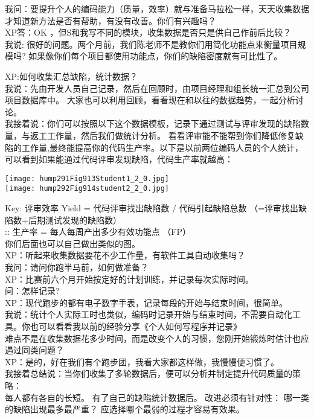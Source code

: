 我问：要提升个人的编码能力（质量，效率）就与准备马拉松一样，天天收集数据才知道新方法是否有帮助，有没有改善。你们有兴趣吗？\\
XP答：OK ，但S和我写不同的模块，收集数据是否只是供自己作前后比较？\\
我说:
很好的问题。两个月前，我们陈老师不是教你们用简化功能点来衡量项目规模吗?
如果像你们每个项目都使用功能点，你们的缺陷密度就有可比性了。

XP:如何收集汇总缺陷，统计数据？\\
我说：先由开发人员自己记录，然后在回顾时，由项目经理和组长统一汇总到公司项目数据库中。
大家也可以利用回顾，看看现在和以往的数据趋势，一起分析讨论。\\
我接着说：你们可以按照以下这个数据模板，记录下通过测试与评审发现的缺陷数量，与返工工作量，然后我们做统计分析。
看看评审能不能帮到你们降低修复缺陷的工作量,最终能提高你的代码生产率。以下是以前两位编码人员的个人统计，可以看到如果能通过代码评审发现缺陷，代码生产率就越高：

\texttt{[image: hump291Fig913Student1\_2\_0.jpg]}\\
\texttt{[image: hump292Fig914student2\_2\_0.jpg]}

Key: 评审效率 Yield = 代码评审找出缺陷数 / 代码引起缺陷总数
（=评审找出缺陷数+后期测试发现的缺陷数）\\
:: 生产率 = 每人每周产出多少有效功能点 （FP）\\
你们后面也可以自己做出类似的图。\\
XP：听起来收集数据要花不少工作量，有软件工具自动收集吗？\\
我问：请问你跑半马前，如何做准备？\\
XP：比赛前六个月开始按定好的计划训练，并记录每次实际时间。\\
问：怎样记录?\\
XP：现代跑步的都有电子数字手表，记录每段的开始与结束时间，很简单。\\
我说：统计个人实际工时也类似，编码时记录开始与结束时间，不需要自动化工具。你也可以看看我以前的经验分享《个人如何写程序并记录》\\
难点不是在收集数据花多少时间，而是改变个人的习惯，您刚开始锻炼时估计也应遇过同类问题？\\
XP：是的，好在我们有个跑步团，我看大家都这样做，我慢慢便习惯了。\\
我接着总结说：当你们收集了多轮数据后，便可以分析并制定提升代码质量的策略：\\
每人都有各自的长短。 有了自己的缺陷统计数据后。 改进必须有针对性：
哪一类的缺陷出现最多最严重？ 应选择哪个最弱的过程才容易有效果。

